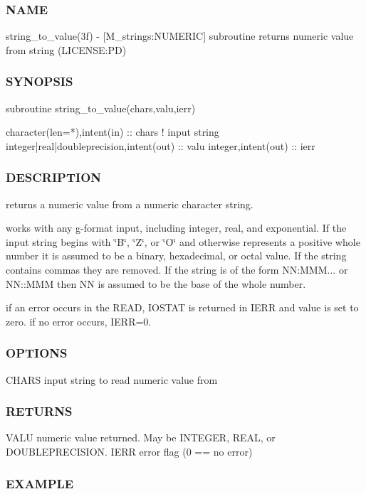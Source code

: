 \subsubsection*{N\+A\+ME}

string\+\_\+to\+\_\+value(3f) -\/ \mbox{[}M\+\_\+strings\+:N\+U\+M\+E\+R\+IC\mbox{]} subroutine returns numeric value from string (L\+I\+C\+E\+N\+SE\+:PD) 

\subsubsection*{S\+Y\+N\+O\+P\+S\+IS}

\begin{DoxyVerb}subroutine string_to_value(chars,valu,ierr)

 character(len=*),intent(in)              :: chars   ! input string
 integer|real|doubleprecision,intent(out) :: valu
 integer,intent(out)                      :: ierr
\end{DoxyVerb}
 \subsubsection*{D\+E\+S\+C\+R\+I\+P\+T\+I\+ON}

returns a numeric value from a numeric character string.

works with any g-\/format input, including integer, real, and exponential. If the input string begins with \char`\"{}\+B\char`\"{}, \char`\"{}\+Z\char`\"{}, or \char`\"{}\+O\char`\"{} and otherwise represents a positive whole number it is assumed to be a binary, hexadecimal, or octal value. If the string contains commas they are removed. If the string is of the form NN\+:M\+MM... or N\+N\+::\+M\+MM then NN is assumed to be the base of the whole number.

if an error occurs in the R\+E\+AD, I\+O\+S\+T\+AT is returned in I\+E\+RR and value is set to zero. if no error occurs, I\+E\+RR=0. \subsubsection*{O\+P\+T\+I\+O\+NS}

C\+H\+A\+RS input string to read numeric value from \subsubsection*{R\+E\+T\+U\+R\+NS}

V\+A\+LU numeric value returned. May be I\+N\+T\+E\+G\+ER, R\+E\+AL, or D\+O\+U\+B\+L\+E\+P\+R\+E\+C\+I\+S\+I\+ON. I\+E\+RR error flag (0 == no error) \subsubsection*{E\+X\+A\+M\+P\+LE}

